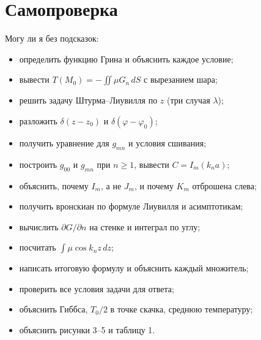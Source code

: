 \documentclass[a4paper,12pt]{article}
\renewcommand{\ge}{\geqslant}
\begin{document}
\section{Самопроверка}

Могу ли я без подсказок:
\begin{itemize}[label=$\square$]
  \item определить функцию Грина и объяснить каждое условие;
  \item вывести $T(M_0)=-\iint\mu G_n\,dS$ с вырезанием шара;
  \item решить задачу Штурма–Лиувилля по $z$ (три случая $\lambda$);
  \item разложить $\delta(z-z_0)$ и $\delta(\varphi-\varphi_0)$;
  \item получить уравнение для $g_{mn}$ и условия сшивания;
  \item построить $g_{00}$ и $g_{mn}$ при $n\ge1$, вывести $C=I_m(k_na)$;
  \item объяснить, почему $I_m$, а не $J_m$, и почему $K_m$ отброшена слева;
  \item получить вронскиан по формуле Лиувилля и асимптотикам;
  \item вычислить $\partial G/\partial n$ на стенке и интеграл по углу;
  \item посчитать $\int\mu\cos k_nz\,dz$;
  \item написать итоговую формулу и объяснить каждый множитель;
  \item проверить все условия задачи для ответа;
  \item объяснить Гиббса, $T_0/2$ в точке скачка, среднюю температуру;
  \item объяснить рисунки 3–5 и таблицу 1.
\end{itemize}
\end{document}
